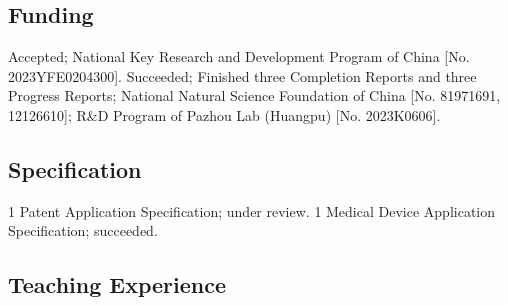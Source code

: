 \documentclass[11pt,a4paper, final]{moderncv}
\newcommand{\spacesection}{\vspace{0.4cm}}
\newcommand{\spacesubsection}{\vspace{0.2cm}}
\begin{document}
	\subsection{\textbf{Funding}}
		{Accepted; National Key Research and Development Program of China [No. 2023YFE0204300].}
		{Succeeded; Finished three Completion Reports and three Progress Reports; 
		National Natural Science Foundation of China [No. 81971691, 12126610]; 
		R\&D Program of Pazhou Lab (Huangpu) [No. 2023K0606].}
	\subsection{\textbf{Specification}}
		{1 Patent Application Specification; under review.}
		{1 Medical Device Application Specification; succeeded.}
	\subsection{\textbf{Teaching Experience}}
\end{document}

